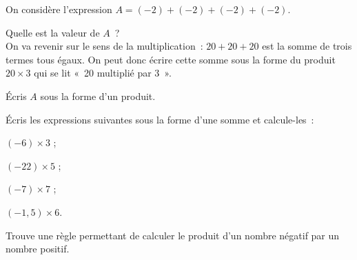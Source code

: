 \begin{activite} \label{MultDivRelatifs_acti1}

On considère l'expression $A = (-2) + (-2) + (-2) + (-2)$.

\begin{partie}
Quelle est la valeur de $A$ ? \\[0.5em]
On va revenir sur le sens de la multiplication : $20 + 20 + 20$ est la somme de trois termes tous égaux. On peut donc écrire cette somme sous la forme du produit $20 \times 3$ qui se lit « 20 multiplié par 3 ».
\end{partie}

\begin{partie}
Écris $A$ sous la forme d'un produit.
 \end{partie}
 
\begin{partie} 
Écris les expressions suivantes sous la forme d'une somme et calcule-les :
 \begin{colenumerate}{4}
  \item $(-6) \times 3$ ;
  \item $(-22) \times 5$ ;
  \item $(-7) \times 7$ ;
  \item $(-1,5) \times 6$.
  \end{colenumerate}
 \end{partie}
 
\begin{partie} \label{MultDivRelatifs_acti2}
Trouve une règle permettant de calculer le produit d'un nombre négatif par un nombre positif.
 \end{partie}

\end{activite}


